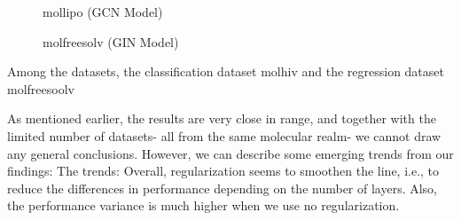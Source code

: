 \begin{figure}
    \centering
    \caption{mollipo (GCN Model)}
    \label{fig:prob-gcn-mollipo}
\end{figure}




\begin{figure}
    \centering
    \caption{molfreesolv (GIN Model)}
    \label{fig:prob-gin-molfreesolv}
\end{figure}




Among the datasets, the classification dataset molhiv and the regression dataset molfreesoolv

As mentioned earlier, the results are very close in range, and together with the limited number of datasets- all from the same molecular realm- we cannot draw any general conclusions. However, we can describe some emerging trends from our findings:
The trends:
Overall, regularization seems to smoothen the line, i.e., to reduce the differences in performance depending on the number of layers. Also, the performance variance is much higher when we use no regularization.



